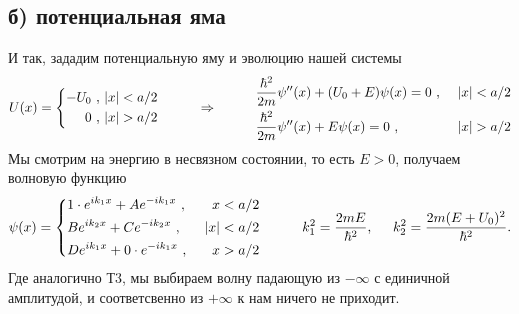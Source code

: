 \subsection*{б) потенциальная яма}
И так, зададим потенциальную яму и эволюцию нашей системы
\begin{equation*}
	U(x) = \left\{\begin{aligned}
		- U_0 \ , \ &|x| < a/2\\
		0\ , \ &|x|>a/2
	\end{aligned}\right.
	\hspace{1 cm}
	\Rightarrow
	\hspace{1 cm}
	\begin{aligned}
		&\frac{\hbar^2}{2m} \psi''(x) + (U_0 + E) \psi(x) = 0 \ , \ &|x| < a/2\\
		&\frac{\hbar^2}{2m} \psi''(x) + E \psi(x) = 0 \ , \ &|x|>a/2
	\end{aligned}
\end{equation*}
Мы смотрим на энергию в несвязном состоянии, то есть $E>0$, получаем волновую функцию
\begin{equation*}
	\psi(x) = \left\{\begin{aligned}
		&1 \cdot e^{i k_1 x} + A e^{- i k_1 x}\ , \ & x<a/2 \\
		&B e^{i k_2 x} + C e^{- i k_2 x} \ , \ & |x|<a/2 \\
		&D e^{i k_1 x} + 0 \cdot e^{- i k_1 x}\ , \ & x > a/2
	\end{aligned}\right.
	\hspace{1 cm}
	k_1^2 = \frac{2 m E}{\hbar^2},
	\hspace{0.5 cm}
	k_2^2 = \frac{2 m (E + U_0)^2}{\hbar^2}.
\end{equation*}
Где аналогично Т3, мы выбираем волну падающую из $-\infty$ с единичной амплитудой, и соответсвенно из $+\infty$ к нам ничего не приходит.

